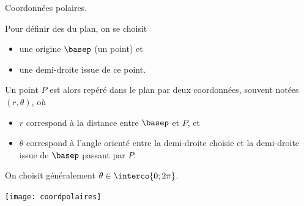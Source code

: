 \documentclass[french,xcolor=svgnames]{beamer}
\begin{document}
\begin{frame}{Coordonnées polaires.}

Pour définir des  du
plan, on se choisit
\begin{itemize}
\item une origine $\basep$ (un point) et
\item une demi-droite issue de ce point.
\end{itemize}

Un point $P$ est alors repéré dans le plan par deux coordonnées, souvent notées $(r, \theta)$, où
\begin{itemize}
\item $r$ correspond à la distance entre $\basep$ et $P$, et
\item $\theta$ correspond à l'angle orienté entre la demi-droite choisie et la demi-droite issue de $\basep$ passant par $P$.
\end{itemize}
On choisit généralement $\theta \in \interco{0;2\pi}$.
\begin{center}
\texttt{[image: coordpolaires]}
\end{center}
\end{frame}
\end{document}
